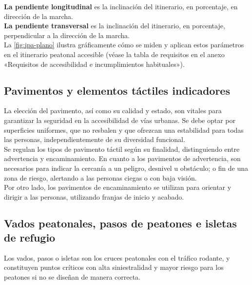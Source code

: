 \textbf{La pendiente longitudinal} es la inclinación del itinerario, en porcentaje, en dirección de la marcha.
\\

\textbf{La pendiente transversal} es la inclinación del itinerario, en porcentaje, perpendicular a la dirección de la marcha.
\\


La \autoref{fig:ipa-plano} ilustra gráficamente cómo se miden y aplican estos parámetros en el itinerario peatonal accesible (véase la tabla de requisitos en el anexo «Requisitos de accesibilidad e incumplimientos habituales»).
\\

\subsection{Pavimentos y elementos táctiles indicadores}
\label{subsec:pavimentos}

La elección del pavimento, así como su calidad y estado, son vitales para garantizar la seguridad en la accesibilidad de vías urbanas. Se debe optar por superficies uniformes, que no resbalen y que ofrezcan una estabilidad para todas las personas, independientemente de su diversidad funcional.
\\

Se regulan los tipos de pavimento táctil según su finalidad, distinguiendo entre advertencia y encaminamiento. En cuanto a los pavimentos de advertencia, son necesarios para indicar la cercanía a un peligro, desnivel u obstáculo; o fin de una zona de riesgo, alertando a las personas ciegas o con baja visión.
\\

Por otro lado, los pavimentos de encaminamiento se utilizan para orientar y dirigir a las personas, utilizando franjas de inicio y acabado.
\\


\subsection{Vados peatonales, pasos de peatones e isletas de refugio}
\label{subsec:vados}

Los vados, pasos o isletas son los cruces peatonales con el tráfico rodante, y constituyen puntos críticos con alta siniestralidad y mayor riesgo para los peatones si no se diseñan de manera correcta.
\\


